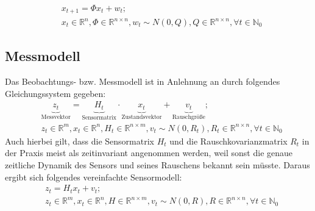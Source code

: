 \documentclass[12pt,a4paper,headsepline,bibliography=totoc,listof=totoc,headinclude=false,footinclude=false,BCOR5mm]{scrreprt} %
\begin{document}
 \begin{equation}\label{systemequf} \begin{split} & x_{t+1} = \Phi  x_{t} + w_{t};  \\&  x_t \in \mathbb{R}^{n}, \Phi \in \mathbb{R}^{n \times n}, w_t \sim N(0,Q), Q \in \mathbb{R}^{n \times n}, \forall t \in \mathbb{N}_{0}
\end{split} \end{equation}

\subsection{Messmodell}
Das Beobachtungs- bzw. Messmodell ist in Anlehnung an \cite[S. 10]{Sorenson1970} durch folgendes Gleichungssystem gegeben:
 \begin{equation}\label{messequ} \begin{split} & \underbrace{z_{t}}_{\text{Messvektor}} = \underbrace{H_{t}}_{\text{Sensormatrix}} \cdot \underbrace{x_{t}}_{\text{Zustandsvektor}}+\underbrace{v_{t}}_{\text{Rauschgr\"o{\ss}e}};  \\& z_t \in \mathbb{R}^{m},  x_t \in \mathbb{R}^{n}, H_t \in \mathbb{R}^{n \times m}, v_t \sim N(0,R_t), R_t \in \mathbb{R}^{n \times n}, \forall t \in \mathbb{N}_{0}
\end{split} \end{equation}
Auch hierbei gilt, dass die Sensormatrix $H_{t}$ und die Rauschkovarianzmatrix $R_t$ in der Praxis meist als zeitinvariant angenommen werden, weil sonst die genaue zeitliche Dynamik des Sensors und seines Rauschens bekannt sein m{\"u}sste. Daraus ergibt sich folgendes vereinfachte Sensormodell:
 \begin{equation}\label{messequf} \begin{split} & z_{t} = H_{t} x_{t} + v_{t};  \\& z_t \in \mathbb{R}^{m},  x_t \in \mathbb{R}^{n}, H \in \mathbb{R}^{n \times m}, v_t \sim N(0,R), R \in \mathbb{R}^{n \times n}, \forall t \in \mathbb{N}_{0}
\end{split} \end{equation}
\end{document}
